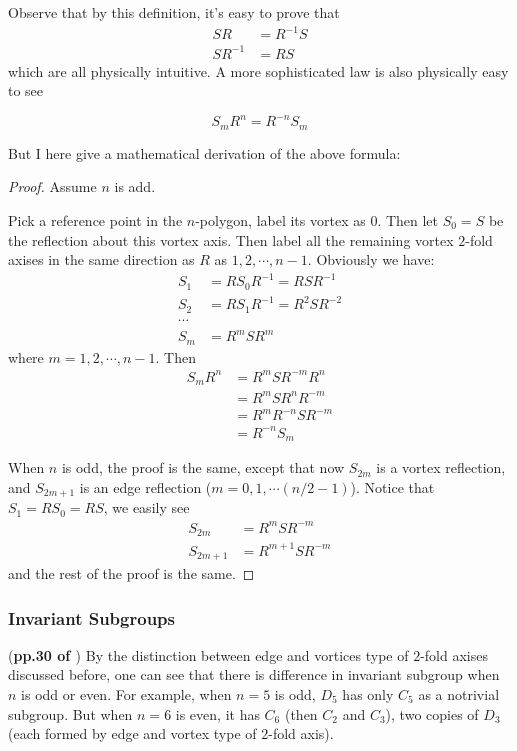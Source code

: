 Observe that by this definition, it's easy to prove that
\begin{align}
    SR &= R^{-1}S \\
    SR^{-1} &= RS
\end{align}
which are all physically intuitive. A more sophisticated law is
also physically easy to see
\begin{fact}
    \begin{equation}
        S_m R^n = R^{-n}S_m
    \end{equation}
\end{fact}
But I here give a mathematical derivation of the above formula:
\begin{proof}
    Assume $n$ is add.

    Pick a reference point in the $n$-polygon, label its vortex as $0$. Then
    let $S_0= S$ be the reflection about this vortex axis. Then label
    all the remaining vortex $2$-fold axises in the same direction as
    $R$ as $1,2,\cdots,n-1$. Obviously we have:
    \begin{align}
        S_1 &= RS_0 R^{-1} = RSR^{-1} \nonumber\\
        S_2 &= RS_1 R^{-1} = R^2 S R^{-2} \nonumber\\
        \cdots & \nonumber \\
        S_{m} &= R^{m} S R^{m}
    \end{align}
    where $m=1,2,\cdots,n-1$. Then
    \begin{align*}
        S_m R^n &= R^m S R^{-m} R^n \\
          &= R^m S R^n R^{-m}\\
          &= R^m R^{-n} S R^{-m} \\
          &= R^{-n} S_m
    \end{align*}

    When $n$ is odd, the proof is the same, except that now $S_{2m}$ is a
    vortex reflection, and $S_{2m+1}$ is an edge reflection
    ($m=0,1,\cdots (n/2-1)$). Notice that $S_1= RS_0 = RS$, we easily
    see
    \begin{align}
        S_{2m} &= R^m S R^{-m} \\
        S_{2m+1} &= R^{m+1} S R^{-m}
    \end{align}
    and the rest of the proof is the same.
\end{proof}

\subsubsection{Invariant Subgroups} (\textbf{pp.30 of \cite{book}})
By the distinction between edge and vortices type of $2$-fold axises
discussed before, one can see that there is difference in invariant
subgroup when $n$ is odd or even. For example, when $n=5$ is odd,
$D_5$ has only $C_5$ as a notrivial subgroup. But when
$n=6$ is even, it has $C_6$ (then $C_2$ and $C_3$), two copies of
$D_3$ (each formed by edge and vortex type of $2$-fold axis).


